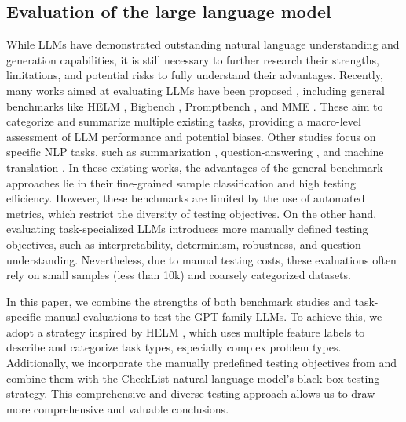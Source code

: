 \documentclass[runningheads]{llncs}
\begin{document}
\subsection{Evaluation of the large language model}
While LLMs have demonstrated outstanding natural language understanding and generation capabilities, it is still necessary to further research their strengths, limitations, and potential risks to fully understand their advantages. Recently, many works aimed at evaluating LLMs have been proposed \cite{chang2023survey}, including general benchmarks like HELM \cite{liang2022holistic}, Bigbench \cite{srivastava2022beyond}, Promptbench \cite{zhu2023promptbench}, and MME \cite{fu2023mme}. These aim to categorize and summarize multiple existing tasks, providing a macro-level assessment of LLM performance and potential biases. Other studies focus on specific NLP tasks, such as summarization \cite{bang2023multitask}, question-answering \cite{bang2023multitask,bai2023benchmarking,omar2023chatgpt}, and machine translation \cite{lyu2023new}. In these existing works, the advantages of the general benchmark approaches lie in their fine-grained sample classification and high testing efficiency. However, these benchmarks are limited by the use of automated metrics, which restrict the diversity of testing objectives. On the other hand, evaluating task-specialized LLMs introduces more manually defined testing objectives, such as interpretability, determinism, robustness, and question understanding. Nevertheless, due to manual testing costs, these evaluations often rely on small samples (less than 10k) and coarsely categorized datasets.

In this paper, we combine the strengths of both benchmark studies and task-specific manual evaluations to test the GPT family LLMs. To achieve this, we adopt a strategy inspired by HELM \cite{liang2022holistic}, which uses multiple feature labels to describe and categorize task types, especially complex problem types. Additionally, we incorporate the manually predefined testing objectives from \cite{omar2023chatgpt} and combine them with the CheckList natural language model's black-box testing strategy. This comprehensive and diverse testing approach allows us to draw more comprehensive and valuable conclusions.
\end{document}
